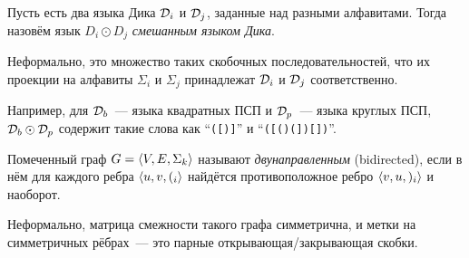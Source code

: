 \begin{definition}
  Пусть есть два языка Дика $\mathcal{D}_i$ и $\mathcal{D}_j$, заданные над разными алфавитами. Тогда назовём язык $D_i \odot D_j$ \textit{смешанным языком Дика}.

  Неформально, это множество таких скобочных последовательностей, что их проекции на алфавиты $\Sigma_i$ и $\Sigma_j$ принадлежат $\mathcal{D}_i$ и $\mathcal{D}_j$ соответственно.

  Например, для $\mathcal{D}_b$~--- языка квадратных ПСП и $\mathcal{D}_p$~--- языка круглых ПСП, $\mathcal{D}_b \odot \mathcal{D}_p$ содержит такие слова как ``\texttt{([)]}'' и ``\texttt{([()(])[])}''.
\end{definition}


\begin{definition}
  Помеченный граф $G = \langle V, E, \Sigma_k \rangle$ называют \textit{двунаправленным} (bidirected), если в нём для каждого ребра $\langle u, v, (_i \rangle$ найдётся противоположное ребро $\langle v, u, )_i \rangle$ и наоборот.

  Неформально, матрица смежности такого графа симметрична, и метки на симметричных рёбрах~--- это парные открывающая/закрывающая скобки.
\end{definition}

